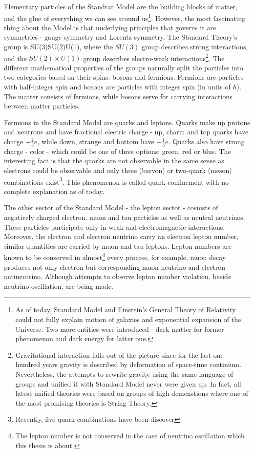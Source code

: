Elementary particles of the Standrar Model are the building blocks of matter, and the glue of everything we
can see around us\footnote{As of today, Standard Model and Einstein's General Theory of 
Relativity could not fully explain motion of galaxies and exponential expansion of the Universe. 
Two more entities were introduced - dark matter for former phenomenon and dark energy 
for latter one.}. However, the most fascinating thing about the Model is that underlying 
principles that governs it are symmetries - gauge symmetry and Lorentz 
symmetry. The Standard Theory's group is 
\be
SU(3)\times SU(2)\times U(1),
\ee 
where the $SU(3)$ group describes strong interactions, and the $SU(2)\times U(1)$ group describes 
electro-weak interactions\footnote{Gravitational interaction falls out of the picture
since for the last one hundred years gravity is described by deformation of space-time 
continium. Nevertheless, the attempts to rewrite gravity using the same language of groups
and unified it with Standard Model never were given up. In fact, all latest unified theories 
were based on groups of high demenstions where one of the most promising theories is 
String Theory.}. The different mathematical properties of the groups naturally split
the particles into two categories based on their spins: bosons and fermions. Fermions are 
particles with half-integer spin and bosons are particles with integer spin (in units of $\hbar$). 
The matter consists of fermions, while bosons serve for carrying interactions between matter particles.

Fermions in the Standard Model are quarks and leptons. Quarks make up protons
and neutrons and have fractional electric charge - up, charm and top quarks have charge $+\frac{2}{3}e$, 
while down, strange and bottom have $-\frac{1}{3}e$. Quarks also have strong charge - color -
which could be one of three options: green, red or blue. The interesting fact is that the quarks
are not observable in the same sense as electrons could be observable and only three (baryon) or 
two-quark (meson) combinations exist\footnote{Recently, five quark combinations have been discover}. 
This phenomenon is called quark confinement with no complete explanation as of today. 

The other sector of the Standard Model - the lepton sector - cosnists of negatively charged electron,
muon and tau particles as well as neutral neutrinos. These particles participate only in
weak and electromagnetic interactions. Moreover, the electron and electron neutrino carry an electron 
lepton number, similar quantities are carried by muon and tau leptons. Lepton numbers are known to be 
conserved in almost\footnote{The lepton number is not conserved in the case of neutrino oscillation which
this thesis is about.} every process, for example, muon decay produces not only electron but corresponding muon 
neutrino and electron antineutrino. Although attempts to observe lepton number violation, beside neutrino
oscillation, are being made.

